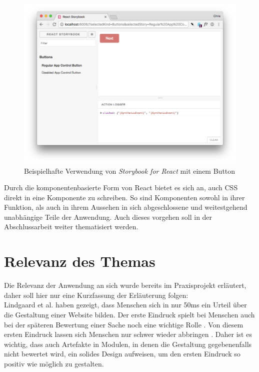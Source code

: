 \begin{figure}[h]
  \centering
  \includegraphics[width=1\textwidth]{images/ReactStroybooksExample.png}
  \caption{Beispielhafte Verwendung von \textit{Storybook for React} mit einem Button}
  \label{fig:storybook}
\end{figure}

Durch die komponentenbasierte Form von React bietet es sich an, auch CSS direkt in eine Komponente zu schreiben. So sind Komponenten sowohl in ihrer Funktion, als auch in ihrem Aussehen in sich abgeschlossene und weitestgehend unabhängige Teile der Anwendung. Auch dieses vorgehen soll in der Abschlussarbeit weiter thematisiert werden.

\section{Relevanz des Themas}
Die Relevanz der Anwendung an sich wurde bereits im Praxisprojekt erläutert, daher soll hier nur eine Kurzfassung der Erläuterung folgen:\\
Lindgaard et al. \cite{lindgaard2006attention} haben gezeigt, dass Menschen sich in nur 50ms ein Urteil über die Gestaltung einer Website bilden. Der erste Eindruck spielt bei Menschen auch bei der späteren Bewertung einer Sache noch eine wichtige Rolle \cite{campbell1996fitting}. Von diesem ersten Eindruck lassen sich Menschen nur schwer wieder abbringen \cite{nickerson1998confirmation}.
Daher ist es wichtig, dass auch Artefakte in Modulen, in denen die Gestaltung gegebenenfalls nicht bewertet wird, ein solides Design aufweisen, um den ersten Eindruck so positiv wie möglich zu gestalten.

